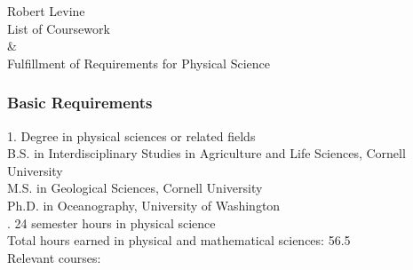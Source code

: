 \documentclass[12pt,a4paper]{article}
\begin{document}
\begin{center}
{\Large Robert Levine} 
\medskip\\
List of Coursework\\ \& \\ Fulfillment of Requirements for Physical Science
\end{center}
\subsubsection*{Basic Requirements}

1. Degree in physical sciences or related fields
\medskip\\ B.S. in Interdisciplinary Studies in Agriculture and Life Sciences, Cornell University\\
M.S. in Geological Sciences, Cornell University\\
Ph.D. in Oceanography, University of Washington\\

. 24 semester hours in physical science %
\medskip\\
Total hours earned in physical and mathematical sciences: 56.5
\medskip\\
Relevant courses:\\

\end{document}
